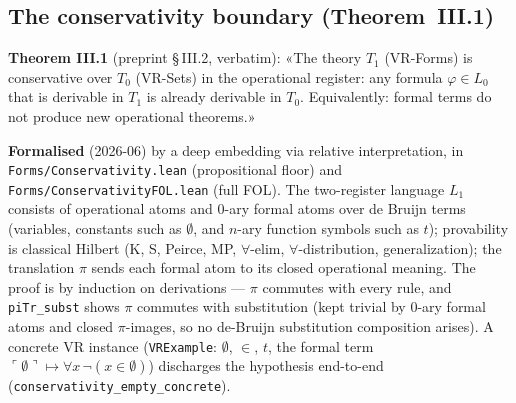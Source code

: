 \subsection{The conservativity boundary (Theorem~III.1)}
\label{subsec:conservativity}

\begin{theorem}
\label{thm:conservativity}
\leanok
{}
\textbf{Theorem III.1} (preprint §\,III.2, verbatim): «The theory $T_1$
(VR-Forms) is conservative over $T_0$ (VR-Sets) in the operational
register: any formula $\varphi \in L_0$ that is derivable in $T_1$ is
already derivable in $T_0$.  Equivalently: formal terms do not produce
new operational theorems.»

\textbf{Formalised} (2026-06) by a deep embedding via relative interpretation, in
\texttt{Forms/Conservativity.lean} (propositional floor) and
\texttt{Forms/ConservativityFOL.lean} (full FOL).  The two-register language $L_1$ consists of
operational atoms and $0$-ary formal atoms over de Bruijn terms (variables, constants such as
$\emptyset$, and $n$-ary function symbols such as $t$); provability is classical Hilbert
(K, S, Peirce, MP, $\forall$-elim, $\forall$-distribution, generalization); the translation
$\pi$ sends each formal atom to its closed operational meaning.  The proof is by induction on
derivations --- $\pi$ commutes with every rule, and \texttt{piTr\_subst} shows $\pi$ commutes
with substitution (kept trivial by $0$-ary formal atoms and closed $\pi$-images, so no de-Bruijn
substitution composition arises).  A concrete VR instance (\texttt{VRExample}: $\emptyset$,
$\in$, $t$, the formal term $\ulcorner\emptyset\urcorner \mapsto \forall x\,\lnot(x\in\emptyset)$)
discharges the hypothesis end-to-end (\texttt{conservativity\_empty\_concrete}).


\end{theorem}
